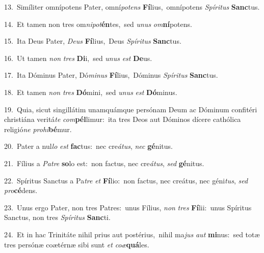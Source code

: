 {\numbfont\textcolor{\numbcolor}{13.}}~Simíliter omnípotens Pater, omní\-\textit{pot}\-\textit{ens} \textbf{Fí}\-lius,~\star omnípotens \textit{Spí}\-\textit{ri}\textit{tus} \textbf{Sanc}\-tus.\par
{\numbfont\textcolor{\numbcolor}{14.}}~Et tamen non tres om\-\textit{ni}\-\textit{pot}\textbf{én}tes,~\star sed \textit{u}\-\textit{nus} \textit{om}\-\textbf{ní}potens.\par
{\numbfont\textcolor{\numbcolor}{15.}}~Ita Deus Pater, \textit{De}\-\textit{us} \textbf{Fí}\-lius,~\star Deus \textit{Spí}\-\textit{ri}\textit{tus} \textbf{Sanc}\-tus.\par
{\numbfont\textcolor{\numbcolor}{16.}}~Ut tamen \textit{non} \textit{tres} \textbf{Di}\-i,~\star sed \textit{u}\-\textit{nus} \textit{est} \textbf{De}\-us.\par
{\numbfont\textcolor{\numbcolor}{17.}}~Ita Dóminus Pater, Dó\-\textit{mi}\-\textit{nus} \textbf{Fí}\-lius,~\star Dóminus \textit{Spí}\-\textit{ri}\textit{tus} \textbf{Sanc}\-tus.\par
{\numbfont\textcolor{\numbcolor}{18.}}~Et tamen \textit{non} \textit{tres} \textbf{Dó}\-mini,~\star sed \textit{u}\-\textit{nus} \textit{est} \textbf{Dó}\-minus.\par
{\numbfont\textcolor{\numbcolor}{19.}}~Quia, sicut singillátim unamquámque persónam Deum ac Dóminum confitéri christiána veritá\textit{te} \textit{com}\-\textbf{pél}limur:~\star ita tres Deos aut Dóminos dícere cathólica religió\textit{ne} \textit{pro}\-\textit{hi}\textbf{bé}mur.\par
{\numbfont\textcolor{\numbcolor}{20.}}~Pater a nul\textit{lo} \textit{est} \textbf{fac}\-tus:~\star nec cre\-\textit{á}\-\textit{tus}, \textit{nec} \textbf{gé}\-nitus.\par
{\numbfont\textcolor{\numbcolor}{21.}}~Fílius a \textit{Pa}\-\textit{tre} \textbf{so}\-lo est:~\star non factus, nec cre\-\textit{á}\-\textit{tus}, \textit{sed} \textbf{gé}\-nitus.\par
{\numbfont\textcolor{\numbcolor}{22.}}~Spíritus Sanctus a Pa\textit{tre} \textit{et} \textbf{Fí}\-lio:~\star non factus, nec creátus, nec géni\-\textit{tus}\-, \textit{sed} \textit{pro}\-\textbf{cé}dens.\par
{\numbfont\textcolor{\numbcolor}{23.}}~Unus ergo Pater, non tres Patres:~\dagger unus Fílius, \textit{non} \textit{tres} \textbf{Fí}\-lii:~\star unus Spíritus Sanctus, non tres \textit{Spí}\-\textit{ri}\textit{tus} \textbf{Sanc}\-ti.\par
{\numbfont\textcolor{\numbcolor}{24.}}~Et in hac Trinitáte nihil prius aut postérius,~\dagger nihil ma\textit{jus} \textit{aut} \textbf{mi}\-nus:~\star sed totæ tres persónæ coætérnæ sibi sunt \textit{et} \textit{co}\-\textit{æ}\textbf{quá}les.\par
